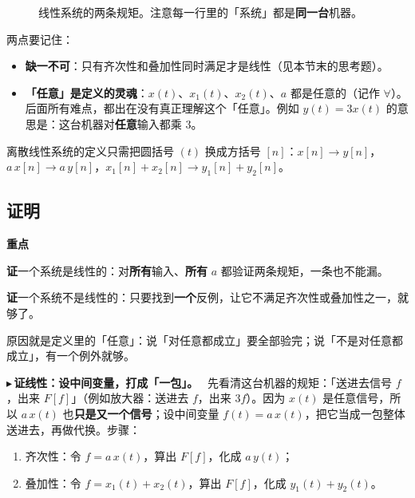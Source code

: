 \documentclass[UTF8,a4paper,11pt]{ctexart}
\newenvironment{remember}{\begin{rememberbox}\textbf{重点}\par\smallskip}{\end{rememberbox}}
\newcounter{ex}[section]
\newcommand{\point}[1]{\par\addvspace{1ex}\noindent\textcolor{ptteal}{$\blacktriangleright$\,\textbf{#1}}\ }
\newcommand{\sysline}[4]{%
  \node[anchor=east] at (2.9,#1) {#2};
  \draw[->,thick] (3.0,#1) -- (3.8,#1);
  \node[draw,rounded corners=2pt,fill=blue!6,minimum width=1.3cm,minimum height=0.62cm] at (4.45,#1) {\small 系统};
  \draw[->,thick] (5.1,#1) -- (5.9,#1);
  \node[anchor=west] at (6.0,#1) {#3};
  \node[anchor=west,gray!55!black,font=\footnotesize] at (9.4,#1) {#4};}
\begin{document}
\begin{figure}[H]
\centering
{}
\caption{线性系统的两条规矩。注意每一行里的「系统」都是\textbf{同一台}机器。}
\end{figure}

两点要记住：
\begin{itemize}[nosep]
\item \textbf{缺一不可}：只有齐次性和叠加性同时满足才是线性（见本节末的思考题）。
\item \textbf{「任意」是定义的灵魂}：$x(t)$、$x_1(t)$、$x_2(t)$、$a$ 都是任意的（记作 $\forall$）。后面所有难点，都出在没有真正理解这个「任意」。例如 $y(t)=3x(t)$ 的意思是：这台机器对\textbf{任意}输入都乘 3。
\end{itemize}
离散线性系统的定义只需把圆括号 $(t)$ 换成方括号 $[n]$：$x[n]\to y[n]$，$a\,x[n]\to a\,y[n]$，$x_1[n]+x_2[n]\to y_1[n]+y_2[n]$。

\subsection{证明}
\begin{remember}
\textbf{证}一个系统是线性的：对\textbf{所有}输入、\textbf{所有} $a$ 都验证两条规矩，一条也不能漏。

\textbf{证}一个系统不是线性的：只要找到\textbf{一个}反例，让它不满足齐次性或叠加性之一，就够了。

原因就是定义里的「任意」：说「对任意都成立」要全部验完；说「不是对任意都成立」，有一个例外就够。
\end{remember}

\point{证线性：设中间变量，打成「一包」。}
先看清这台机器的规矩：「送进去信号 $f$，出来 $F[f]$」（例如放大器：送进去 $f$，出来 $3f$）。因为 $x(t)$ 是任意信号，所以 $a\,x(t)$ 也\textbf{只是又一个信号}；设中间变量 $f(t)=a\,x(t)$，把它当成一包整体送进去，再做代换。步骤：
\begin{enumerate}[nosep]
\item 齐次性：令 $f=a\,x(t)$，算出 $F[f]$，化成 $a\,y(t)$；
\item 叠加性：令 $f=x_1(t)+x_2(t)$，算出 $F[f]$，化成 $y_1(t)+y_2(t)$。
\end{enumerate}
\end{document}
